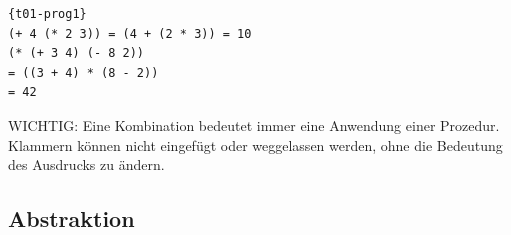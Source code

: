 \begin{lstlisting}{t01-prog1}
(+ 4 (* 2 3)) = (4 + (2 * 3)) = 10
(* (+ 3 4) (- 8 2))
= ((3 + 4) * (8 - 2))
= 42
\end{lstlisting}

WICHTIG:
 Eine Kombination bedeutet immer eine Anwendung einer Prozedur. Klammern können nicht eingefügt oder weggelassen werden, ohne die Bedeutung des Ausdrucks zu ändern.

\subsection{Abstraktion}
